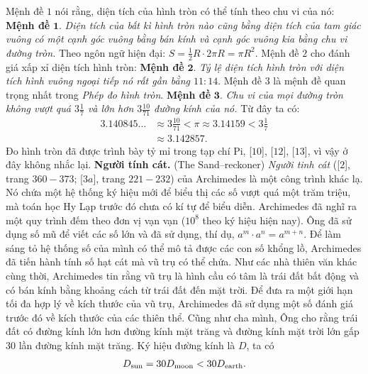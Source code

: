 \begin{multicols}{2}
	\vskip 0.1cm
	Mệnh đề $1$ nói rằng, diện tích của hình tròn có thể tính theo chu vi của nó:
	\vskip 0.1cm
	\textbf{\color{lichsutoanhoc}Mệnh đề} $\pmb{1.}$ \textit{Diện tích của bất kì hình tròn nào cũng bằng diện tích của tam giác vuông có một cạnh góc vuông bằng bán kính và cạnh góc vuông kia bằng chu vi đường tròn.}
	\vskip 0.1cm
	Theo ngôn ngữ hiện đại: $S = \frac{1}{2}R \cdot 2\pi R = \pi {R^2}.$
	\vskip 0.1cm 
	Mệnh đề $2$ cho đánh giá xấp xỉ diện tích hình tròn:
	\vskip 0.1cm
	\textbf{\color{lichsutoanhoc}Mệnh đề} $\pmb{2.}$ \textit{Tỷ lệ diện tích hình tròn với diện tích hình vuông ngoại tiếp nó rất gần bằng $11:14$}.
	\vskip 0.1cm
	Mệnh đề $3$ là mệnh đề quan trọng nhất trong \textit{Phép đo hình tròn}.
	\vskip 0.1cm
	\textbf{\color{lichsutoanhoc}Mệnh đề} $\pmb{3.}$ \textit{Chu vi của mọi đường tròn không vượt quá $3\frac{1}{7}$ và lớn hơn $3\frac{10}{71}$  đường kính của nó.}
	\vskip 0.1cm
	Từ đây ta có: 
	\begin{align*}
		3.140845... &\approx 3\frac{{10}}{{71}} < \pi  \approx 3.14159 < 3\frac{1}{7} \\
		&\approx 3.142857.
	\end{align*}
	Đo hình tròn đã được trình bày tỷ mỉ trong tạp chí Pi, [$10$], [$12$], [$13$], vì vậy ở đây không nhắc lại.
	\vskip 0.1cm
	\textbf{\color{lichsutoanhoc}Người tính cát.} (The Sand--reckoner) \textit{Người tinh cát} ([$2$], trang $360-373$; [$3a$], trang $221-232$) của Archimedes là một công trình khác lạ. Nó chứa một hệ thống ký hiệu mới để biểu thị các số vượt quá một trăm triệu, mà toán học Hy Lạp trước đó chưa có kí tự để biểu diễn. Archimedes đã nghĩ ra một quy trình đếm theo đơn vị vạn vạn ($10^8$ theo ký hiệu hiện nay). Ông đã sử dụng số mũ để viết các số lớn và đã sử dụng, thí dụ,  ${a^m} \cdot {a^n} = {a^{m + n}}.$
	\vskip 0.1cm 
	Để làm sáng tỏ hệ thống số của mình có thể mô tả được các con số khổng lồ, Archimedes đã tiến hành tính số hạt cát mà vũ trụ có thể chứa. Như các nhà thiên văn khác cùng thời, Archimedes tin rằng vũ trụ là hình cầu có tâm là trái đất bất động và có bán kính bằng khoảng cách từ trái đất đến mặt trời. Để đưa ra một giới hạn tối đa hợp lý về kích thước của vũ trụ, Archimedes đã sử dụng một số đánh giá trước đó về kích thước của các thiên thể. Cũng như cha mình, Ông cho rằng trái đất có đường kính lớn hơn đường kính mặt trăng và đường kính mặt trời lớn gấp $30$ lần đường kính mặt trăng. 
	\vskip 0.1cm
	Ký hiệu đường kính là $D$, ta có
	\begin{align*}
		{D_{{\rm{sun}}}} = 30{D_{{\rm{moon}}}} < 30{D_{{\rm{earth}}}}.
	\end{align*}

\end{multicols}
